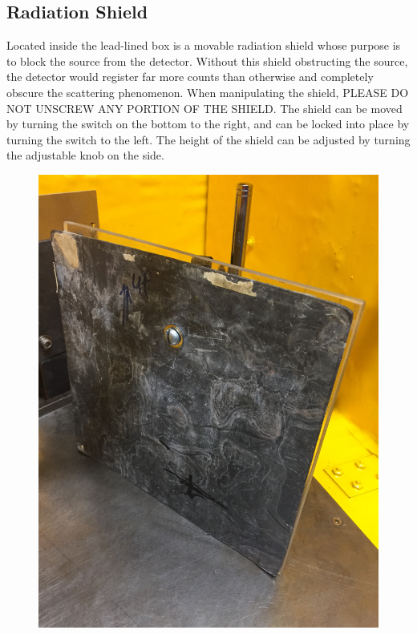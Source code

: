 \documentclass{../lab}
\begin{document}
\subsection{Radiation Shield}

Located inside the lead-lined box is a movable radiation shield whose purpose is to block the source from the detector. Without this shield obstructing the source, the detector would register far more counts than otherwise and completely obscure the scattering phenomenon. When manipulating the shield, PLEASE DO NOT UNSCREW ANY PORTION OF THE SHIELD. The shield can be moved by turning the switch on the bottom to the right, and can be locked into place by turning the switch to the left. The height of the shield can be adjusted by turning the adjustable knob on the side.

\begin{figure}[H]
\begin{minipage}{.49\linewidth}
    \centering
    \href{http://experimentationlab.berkeley.edu/sites/default/files/Shield-Front.JPG}{\includegraphics[width=\linewidth,keepaspectratio]{images/Shield-Front.JPG}} \\

\end{minipage}
\end{figure}
\end{document}
